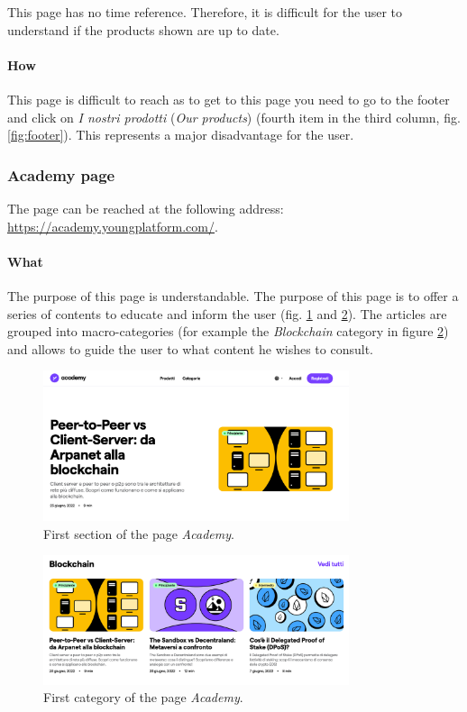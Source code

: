 This page has no time reference. Therefore, it is difficult for the user 
to understand if the products shown are up to date.

\paragraph{How}

This page is difficult to reach as to get to this page you need to go to 
the footer and click on \textit{I nostri prodotti} (\textit{Our products}) 
(fourth item in the third column, fig. \ref{fig:footer}). This represents a 
major disadvantage for the user.

\subsubsection{Academy page}

The page can be reached at the following address: 
\href{https://academy.youngplatform.com/}{https://academy.youngplatform.com/}.

\paragraph{What}

The purpose of this page is understandable. The purpose of this page is to 
offer a series of contents to educate and inform the user 
(fig. \ref{fig:academy-1} and \ref{fig:academy-2}). The articles are 
grouped into macro-categories (for example the \textit{Blockchain} category 
in figure \ref{fig:academy-2}) and allows to guide the user to what content 
he wishes to consult.

\begin{figure}[H]
  \centering
  \includegraphics[width=0.80\textwidth]{res/images/internal-pages/academy/academy-1.png}
  \caption{First section of the page \textit{Academy}.}
  \label{fig:academy-1}
\end{figure}

\begin{figure}[H]
  \centering
  \includegraphics[width=0.80\textwidth]{res/images/internal-pages/academy/academy-2.png}
  \caption{First category of the page \textit{Academy}.}
  \label{fig:academy-2}
\end{figure}


